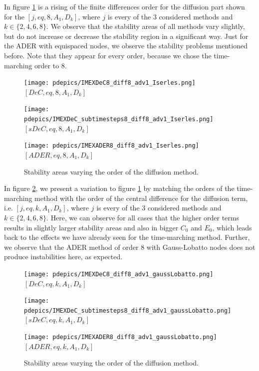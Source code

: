In figure \ref{fig: exa_diffterm} is a rising of the finite differences order for the diffusion part shown for the $[j,eq, 8, A_1,D_k]$, where $j$ is every of the 3 considered methods and $k \in \{2,4,6,8\}$.  We observe that the stability areas of all methods vary slightly, but do not increase or decrease the stability region in a significant way. Just for the ADER with equispaced nodes, we observe the stability problems mentioned before. Note that they appear for every order, because we chose the time-marching order to 8. \\

\begin{figure}[!h]
	\centering
	\begin{minipage}[t]{0.32\textwidth}
		\texttt{[image: pdepics/IMEXDeC8\_diff8\_adv1\_Iserles.png]}
		\centering
		$[DeC,eq, 8, A_1,D_k]$
	\end{minipage} 
	\begin{minipage}[t]{0.32\textwidth}
		\texttt{[image: pdepics/IMEXDeC\_subtimesteps8\_diff8\_adv1\_Iserles.png]}
		\centering
		$[sDeC,eq, 8, A_1,D_k]$
	\end{minipage}
	\begin{minipage}[t]{0.32\textwidth}
		\texttt{[image: pdepics/IMEXADER8\_diff8\_adv1\_Iserles.png]}
		\centering
		$[ADER,eq, 8, A_1,D_k]$
	\end{minipage}
	\caption{Stability areas varying the order of the diffusion method.}
	\label{fig: exa_diffterm}
\end{figure}

In figure \ref{fig: exa_difftermsim}, we present a variation to figure \ref{fig: exa_diffterm} by matching the orders of the time-marching method with the order of the central difference for the diffusion term, i.e.  $[j,eq, k, A_1,D_k]$, where $j$ is every of the 3 considered methods and $k \in \{2,4,6,8\}$.
Here, we can observe for all cases that the higher order terms results in slightly larger stability areas and also in bigger $C_0$ and $E_0$, which leads back to the effects we have already seen for the time-marching method. Further, we observe that the ADER method  of order 8 with Gauss-Lobatto nodes does not produce instabilities here, as expected.\\

\begin{figure}[!h]
	\centering
	\begin{minipage}[t]{0.32\textwidth}
		\texttt{[image: pdepics/IMEXDeC8\_diff8\_adv1\_gaussLobatto.png]}
		\centering
		$[DeC,eq, k, A_1,D_k]$
	\end{minipage} 
	\begin{minipage}[t]{0.32\textwidth}
		\texttt{[image: pdepics/IMEXDeC\_subtimesteps8\_diff8\_adv1\_gaussLobatto.png]}
		\centering
		$[sDeC,eq, k, A_1,D_k]$
	\end{minipage}
	\begin{minipage}[t]{0.32\textwidth}
		\texttt{[image: pdepics/IMEXADER8\_diff8\_adv1\_gaussLobatto.png]}
		\centering
		$[ADER,eq, k, A_1,D_k]$
	\end{minipage}
	\caption{Stability areas varying the order of the diffusion method.}
	\label{fig: exa_difftermsim}
\end{figure}

